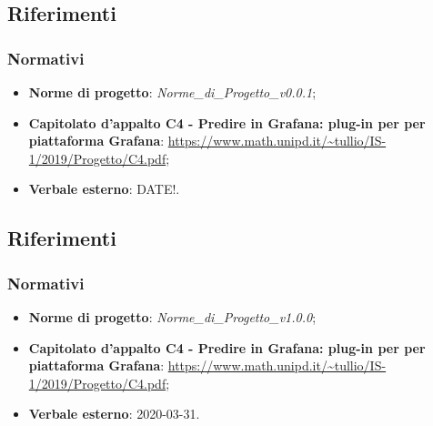 	\subsection{Riferimenti}
		\subsubsection{Normativi}
			\begin{itemize}
				\item \textbf{Norme di progetto}: \emph{Norme\_di\_Progetto\_v0.0.1};
				\item \textbf{Capitolato d'appalto C4 - Predire in Grafana: plug-in per per piattaforma Grafana}: \url{https://www.math.unipd.it/~tullio/IS-1/2019/Progetto/C4.pdf};
				\item \textbf{Verbale esterno}: DATE!. 
			\end{itemize}
		
\subsection{Riferimenti}
		\subsubsection{Normativi}
			\begin{itemize}
				\item \textbf{Norme di progetto}: \emph{Norme\_di\_Progetto\_v1.0.0};
				\item \textbf{Capitolato d'appalto C4 - Predire in Grafana: plug-in per per piattaforma Grafana}: \url{https://www.math.unipd.it/~tullio/IS-1/2019/Progetto/C4.pdf};
				\item \textbf{Verbale esterno}: 2020-03-31. 
			\end{itemize}
		
